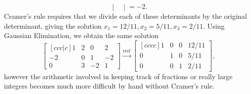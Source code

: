 \begin{example}
$$\begin{vmatrix}
\end {vmatrix}  
=-2 .$$
Cramer's rule requires that we divide each of these determinants by the original determinant, giving the solution $x_1=12/11, x_2 = 5/11, x_3 = 2/11$.  Using Gaussian Elimination, we obtain the same solution 
$$ \begin {bmatrix}[ccc|c] 1&2&0&2\\-2&0&1&-2\\0&3&-2&1\end {bmatrix}\xrightarrow{\text{rref}}
\begin {bmatrix}[cccc] 1&0&0&12/11
\\0&1&0&5/11\\0&0&1&2/11\end {bmatrix} 
, $$
however the arithmetic involved in keeping track of fractions or really large integers becomes much more difficult by hand without Cramer's rule.
\end{example}

